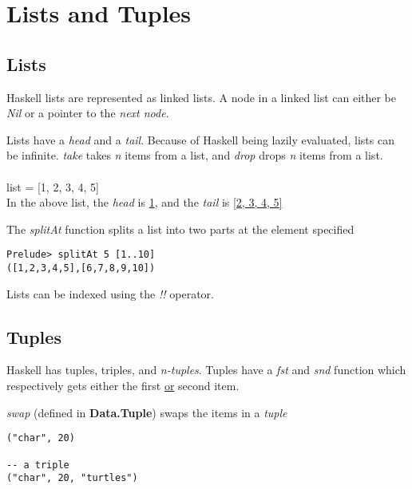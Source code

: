 \section{Lists and Tuples}

\subsection{Lists}
Haskell lists are represented as linked lists.
A node in a linked list can either be \emph{Nil} or a pointer to the \emph{next node}.

Lists have a \emph{head} and a \emph{tail}. Because of Haskell being lazily evaluated, lists can be infinite.
\emph{take} takes \emph{n} items from a list, and \emph{drop} drops \emph{n} items from a list.\\
\\
list = [1, 2, 3, 4, 5]\\
In the above list, the \emph{head} is \underline{1}, and the \emph{tail} is \underline{[2, 3, 4, 5]}

The \emph{splitAt} function splits a list into two parts at the element specified
\begin{verbatim}
Prelude> splitAt 5 [1..10]
([1,2,3,4,5],[6,7,8,9,10])
\end{verbatim}

Lists can be indexed using the \emph{!!} operator.

\subsection{Tuples}
Haskell has tuples, triples, and \emph{n-tuples}. Tuples have a \emph{fst} and \emph{snd} function which
respectively gets either the first \underline{or} second item. 

\emph{swap} (defined in \textbf{Data.Tuple}) swaps the items in a \emph{tuple}

\begin{lstlisting}
("char", 20)

-- a triple
("char", 20, "turtles")
\end{lstlisting}